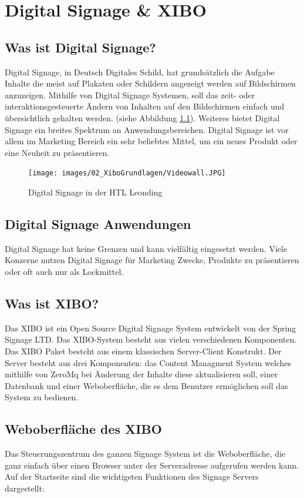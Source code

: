 \chapter{Digital Signage \& XIBO}
\section{Was ist Digital Signage?}\label{sec:digitalsignage}
Digital Signage, in Deutsch Digitales Schild, hat grundsätzlich die Aufgabe Inhalte die meist auf Plakaten oder Schildern angezeigt werden auf Bildschirmen anzuzeigen. Mithilfe von Digital Signage Systemen, soll das zeit- oder interaktionsgesteuerte Ändern von Inhalten auf den Bildschirmen einfach und übersichtlich gehalten werden. (siehe Abbildung \ref{img:digitalsignagehtlleonding}). Weiteres bietet Digital Signage ein breites Spektrum an Anwendungsbereichen. Digital Signage ist vor allem im Marketing Bereich ein sehr beliebtes Mittel, um ein neues Produkt oder eine Neuheit zu präsentieren.

\begin{figure}[H]
\centering
\texttt{[image: images/02\_XiboGrundlagen/Videowall.JPG]}
\caption{Digital Signage in der HTL Leonding}
\label{img:digitalsignagehtlleonding}
\end{figure}

\section{Digital Signage Anwendungen}\label{sec:anwendungedigitalsignage}
Digital Signage hat keine Grenzen und kann vielfältig eingesetzt werden. Viele Konzerne nutzen Digital Signage für Marketing Zwecke, Produkte zu präsentieren oder oft auch nur als Lockmittel.

\section{Was ist XIBO?}\label{sec:xibo}
Das XIBO ist ein Open Source Digital Signage System entwickelt von der Spring Signage LTD. Das XIBO-System besteht aus vielen verschiedenen Komponenten. Das XIBO Paket besteht aus einem klassischen Server-Client Konstrukt. Der Server besteht aus drei Komponenten: das Content Managment System welches mithilfe von ZeroMq bei Änderung der Inhalte diese aktualisieren soll, einer Datenbank und einer Weboberfläche, die es dem Benutzer ermöglichen soll das System zu bedienen. \cite{xibo-server}

\section{Weboberfläche des XIBO}\label{sec:webpagexibo}
Das Steuerungszentrum des ganzen Signage System ist die Weboberfläche, die ganz einfach über einen Browser unter der Serveradresse aufgerufen werden kann. Auf der Startseite sind die wichtigsten Funktionen des Signage Servers dargestellt:


